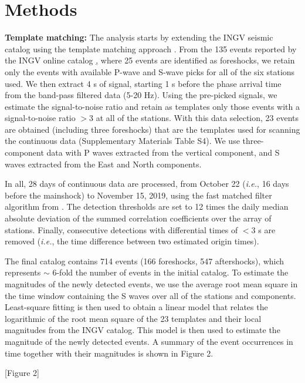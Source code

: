 \documentclass[a4paper,12pt,twoside]{article}
\begin{document}
\section*{Methods} 
\label{sec:methods}

{\bf Template matching:} The analysis starts by extending the INGV seismic catalog using the template matching approach \citep{Gibbons_2006_DLM}. From the 135 events reported by the INGV online catalog \href{http://terremoti.ingv.it/en}, where 25 events are identified as foreshocks, we retain only the events with available P-wave and S-wave picks for all of the six stations used. We then extract 4 s of signal, starting 1 s before the phase arrival time from the band-pass filtered data (5-20 Hz). Using the pre-picked signals, we estimate the signal-to-noise ratio and retain as templates only those events with a signal-to-noise ratio $>$3 at all of the stations. With this data selection, 23 events are obtained (including three foreshocks) that are the templates used for scanning the continuous data (Supplementary Materials Table S4). We use three-component data with P waves extracted from the vertical component, and S waves extracted from the East and North components.

In all, 28 days of continuous data are processed, from October 22 (\emph{i.e.}, 16 days before the mainshock) to November 15, 2019, using the fast matched filter algorithm from \cite{Beauce_2017_FMF}. The detection thresholds are set to 12 times the daily median absolute deviation of the summed correlation coefficients over the array of stations. Finally, consecutive detections with differential times of $<$3 s are removed (\emph{i.e.}, the time difference between two estimated origin times).

The final catalog contains 714 events (166 foreshocks, 547 aftershocks), which represents $\sim$ 6-fold the number of events in the initial catalog. To estimate the magnitudes of the newly detected events, we use the average root mean square in the time window containing the S waves over all of the stations and components. Least-square fitting is then used to obtain a linear model that relates the logarithmic of the root mean square of the 23 templates and their local magnitudes from the INGV catalog. This model is then used to estimate the magnitude of the newly detected events. A summary of the event occurrences in time together with their magnitudes is shown in Figure 2.

\begin{center}
   [Figure 2]
\end{center}
\end{document}
